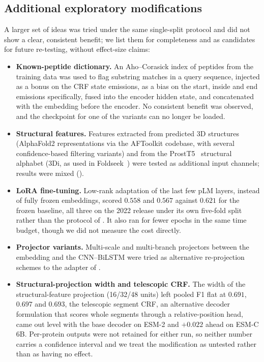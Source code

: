 \documentclass{article}
\begin{document}
\subsection{Additional exploratory modifications}

A larger set of ideas was tried under the same single-split protocol and did not show a clear, consistent benefit; we list them for completeness and as candidates for future re-testing, without effect-size claims:

\begin{itemize}
  \item \textbf{Known-peptide dictionary.} An Aho--Corasick index of peptides from the training data was used to flag substring matches in a query sequence, injected as a bonus on the CRF state emissions, as a bias on the start, inside and end emissions specifically, fused into the encoder hidden state, and concatenated with the embedding before the encoder. No consistent benefit was observed, and the checkpoint for one of the variants can no longer be loaded.
  \item \textbf{Structural features.} Features extracted from predicted 3D structures (AlphaFold2 representations via the AFToolkit codebase, with several confidence-based filtering variants) and from the ProstT5~\citep{heinzinger2023prostt5} structural alphabet (3Di, as used in Foldseek~\citep{vankempen2024foldseek}) were tested as additional input channels; results were mixed ().
  \item \textbf{LoRA fine-tuning.} Low-rank adaptation of the last few pLM layers, instead of fully frozen embeddings, scored $0.558$ and $0.567$ against $0.621$ for the frozen baseline, all three on the 2022 release under its own five-fold split rather than the protocol of . It also ran for fewer epochs in the same time budget, though we did not measure the cost directly.
  \item \textbf{Projector variants.} Multi-scale and multi-branch projectors between the embedding and the CNN--BiLSTM were tried as alternative re-projection schemes to the adapter of .
  \item \textbf{Structural-projection width and telescopic CRF.} The width of the structural-feature projection (16/32/48 units) left pooled F1 flat at $0.691$, $0.697$ and $0.693$, the telescopic segment CRF, an alternative decoder formulation that scores whole segments through a relative-position head, came out level with the base decoder on ESM-2 and $+0.022$ ahead on ESM-C 6B. Per-protein outputs were not retained for either run, so neither number carries a confidence interval and we treat the modification as untested rather than as having no effect.
\end{itemize}
\end{document}
